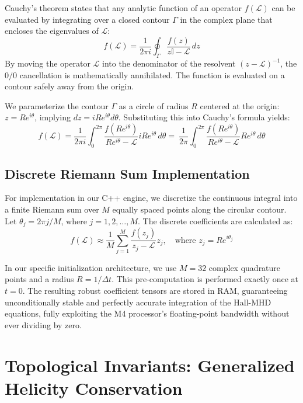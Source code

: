 \documentclass[11pt, a4paper]{article}
\begin{document}
Cauchy's theorem states that any analytic function of an operator $f(\mathcal{L})$ can be evaluated by integrating over a closed contour $\Gamma$ in the complex plane that encloses the eigenvalues of $\mathcal{L}$:
\begin{equation}
    f(\mathcal{L}) = \frac{1}{2\pi i} \oint_\Gamma \frac{f(z)}{z\mathbb{I} - \mathcal{L}} \, dz
\end{equation}
By moving the operator $\mathcal{L}$ into the denominator of the resolvent $(z - \mathcal{L})^{-1}$, the $0/0$ cancellation is mathematically annihilated. The function is evaluated on a contour safely away from the origin.

We parameterize the contour $\Gamma$ as a circle of radius $R$ centered at the origin: $z = R e^{i\theta}$, implying $dz = i R e^{i\theta} d\theta$. Substituting this into Cauchy's formula yields:
\begin{equation}
    f(\mathcal{L}) = \frac{1}{2\pi i} \int_0^{2\pi} \frac{f(R e^{i\theta})}{R e^{i\theta} - \mathcal{L}} i R e^{i\theta} \, d\theta = \ \frac{1}{2\pi} \int_0^{2\pi} \frac{f(R e^{i\theta})}{R e^{i\theta} - \mathcal{L}} R e^{i\theta} \, d\theta
\end{equation}

\subsection{Discrete Riemann Sum Implementation}
For implementation in our C++ engine, we discretize the continuous integral into a finite Riemann sum over $M$ equally spaced points along the circular contour. Let $\theta_j = 2\pi j / M$, where $j = 1, 2, \dots, M$. The discrete coefficients are calculated as:
\begin{equation}
    f(\mathcal{L}) \approx \frac{1}{M} \sum_{j=1}^{M} \frac{f(z_j)}{z_j - \mathcal{L}} z_j, \quad \text{where } z_j = R e^{i\theta_j}
\end{equation}

In our specific initialization architecture, we use $M = 32$ complex quadrature points and a radius $R = 1/\Delta t$. This pre-computation is performed exactly once at $t=0$. The resulting robust coefficient tensors are stored in RAM, guaranteeing unconditionally stable and perfectly accurate integration of the Hall-MHD equations, fully exploiting the M4 processor's floating-point bandwidth without ever dividing by zero.

\section{Topological Invariants: Generalized Helicity Conservation}
\label{sec:helicity}
\end{document}
